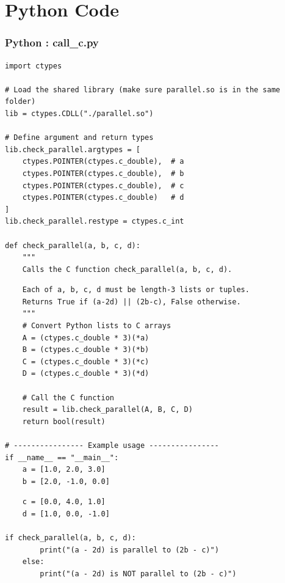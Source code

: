 \documentclass{beamer}
\theoremstyle{remark}
\numberwithin{equation}{section}
\begin{document}
\section{Python Code}
\begin{frame}[fragile]
\frametitle{Python : call\_c.py}
\begin{lstlisting}
import ctypes

# Load the shared library (make sure parallel.so is in the same folder)
lib = ctypes.CDLL("./parallel.so")

# Define argument and return types
lib.check_parallel.argtypes = [
    ctypes.POINTER(ctypes.c_double),  # a
    ctypes.POINTER(ctypes.c_double),  # b
    ctypes.POINTER(ctypes.c_double),  # c
    ctypes.POINTER(ctypes.c_double)   # d
]
lib.check_parallel.restype = ctypes.c_int

def check_parallel(a, b, c, d):
    """
    Calls the C function check_parallel(a, b, c, d).
    \end{lstlisting}
    \end{frame}
    \begin{frame}[fragile]
    \begin{lstlisting}
    Each of a, b, c, d must be length-3 lists or tuples.
    Returns True if (a-2d) || (2b-c), False otherwise.
    """
    # Convert Python lists to C arrays
    A = (ctypes.c_double * 3)(*a)
    B = (ctypes.c_double * 3)(*b)
    C = (ctypes.c_double * 3)(*c)
    D = (ctypes.c_double * 3)(*d)

    # Call the C function
    result = lib.check_parallel(A, B, C, D)
    return bool(result)

# ---------------- Example usage ----------------
if __name__ == "__main__":
    a = [1.0, 2.0, 3.0]
    b = [2.0, -1.0, 0.0]
\end{lstlisting}
\end{frame}
\begin{frame}[fragile]
\begin{lstlisting}
    c = [0.0, 4.0, 1.0]
    d = [1.0, 0.0, -1.0]
    
if check_parallel(a, b, c, d):
        print("(a - 2d) is parallel to (2b - c)")
    else:
        print("(a - 2d) is NOT parallel to (2b - c)")

\end{lstlisting}
\end{frame}
\end{document}
